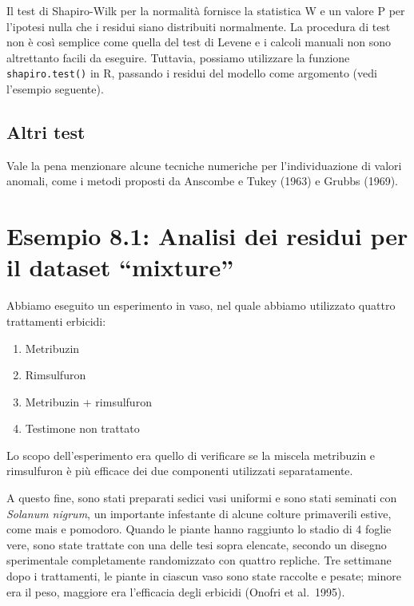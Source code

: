 \documentclass[
  12pt,
]{book}
\providecommand{\tightlist}{%
  \setlength{\itemsep}{0pt}\setlength{\parskip}{0pt}}
\begin{document}
Il test di Shapiro-Wilk per la normalità fornisce la statistica W e un valore P per l'ipotesi nulla che i residui siano distribuiti normalmente. La procedura di test non è così semplice come quella del test di Levene e i calcoli manuali non sono altrettanto facili da eseguire. Tuttavia, possiamo utilizzare la funzione \texttt{shapiro.test()} in R, passando i residui del modello come argomento (vedi l'esempio seguente).

\hypertarget{altri-test}{%
\subsection{Altri test}\label{altri-test}}

Vale la pena menzionare alcune tecniche numeriche per l'individuazione di valori anomali, come i metodi proposti da Anscombe e Tukey (1963) e Grubbs (1969).

\hypertarget{esempio-8.1-analisi-dei-residui-per-il-dataset-mixture}{%
\section{Esempio 8.1: Analisi dei residui per il dataset ``mixture''}\label{esempio-8.1-analisi-dei-residui-per-il-dataset-mixture}}

Abbiamo eseguito un esperimento in vaso, nel quale abbiamo utilizzato quattro trattamenti erbicidi:

\begin{enumerate}
\def\labelenumi{\arabic{enumi}.}
\tightlist
\item
  Metribuzin
\item
  Rimsulfuron
\item
  Metribuzin + rimsulfuron
\item
  Testimone non trattato
\end{enumerate}

Lo scopo dell'esperimento era quello di verificare se la miscela metribuzin e rimsulfuron è più efficace dei due componenti utilizzati separatamente.

A questo fine, sono stati preparati sedici vasi uniformi e sono stati seminati con \emph{Solanum nigrum}, un importante infestante di alcune colture primaverili estive, come mais e pomodoro. Quando le piante hanno raggiunto lo stadio di 4 foglie vere, sono state trattate con una delle tesi sopra elencate, secondo un disegno sperimentale completamente randomizzato con quattro repliche. Tre settimane dopo i trattamenti, le piante in ciascun vaso sono state raccolte e pesate; minore era il peso, maggiore era l'efficacia degli erbicidi (Onofri et al.~1995).
\end{document}
